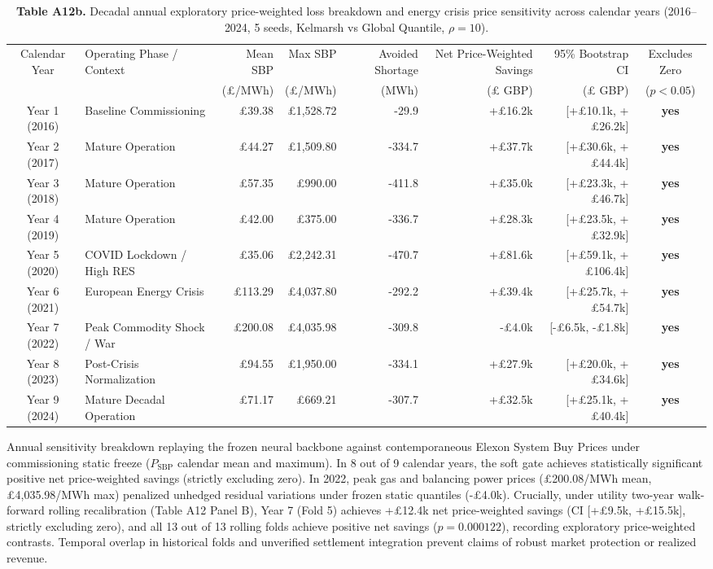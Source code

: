 \documentclass[
  journal]{IEEEtran}
\begin{document}
\begin{table}[!t]
\centering
\fontsize{8.0pt}{9.6pt}\selectfont
\setlength{\tabcolsep}{2.2pt}
\renewcommand{\arraystretch}{1.06}
\caption*{\textbf{Table A12b.} Decadal annual exploratory price-weighted loss breakdown and energy crisis price sensitivity across calendar years (2016--2024, 5 seeds, Kelmarsh vs Global Quantile, $\rho=10$).}
%
\setlength{\tabcolsep}{3pt}
\begin{tabularx}{\linewidth}{c >{\raggedright\arraybackslash}X r r r r r c}
\toprule
Calendar Year & Operating Phase / Context & Mean SBP & Max SBP & Avoided Shortage & Net Price-Weighted Savings & 95\% Bootstrap CI & Excludes Zero \\
 & & (£/MWh) & (£/MWh) & (MWh) & (£ GBP) & (£ GBP) & ($p < 0.05$) \\
\midrule
Year 1 (2016) & Baseline Commissioning & £39.38 & £1,528.72 & -29.9 & +£16.2k & [+£10.1k, +£26.2k] & \textbf{yes} \\
Year 2 (2017) & Mature Operation & £44.27 & £1,509.80 & -334.7 & +£37.7k & [+£30.6k, +£44.4k] & \textbf{yes} \\
Year 3 (2018) & Mature Operation & £57.35 & £990.00 & -411.8 & +£35.0k & [+£23.3k, +£46.7k] & \textbf{yes} \\
Year 4 (2019) & Mature Operation & £42.00 & £375.00 & -336.7 & +£28.3k & [+£23.5k, +£32.9k] & \textbf{yes} \\
Year 5 (2020) & COVID Lockdown / High RES & £35.06 & £2,242.31 & -470.7 & +£81.6k & [+£59.1k, +£106.4k] & \textbf{yes} \\
Year 6 (2021) & European Energy Crisis & £113.29 & £4,037.80 & -292.2 & +£39.4k & [+£25.7k, +£54.7k] & \textbf{yes} \\
Year 7 (2022) & Peak Commodity Shock / War & £200.08 & £4,035.98 & -309.8 & -£4.0k & [-£6.5k, -£1.8k] & \textbf{yes} \\
Year 8 (2023) & Post-Crisis Normalization & £94.55 & £1,950.00 & -334.1 & +£27.9k & [+£20.0k, +£34.6k] & \textbf{yes} \\
Year 9 (2024) & Mature Decadal Operation & £71.17 & £669.21 & -307.7 & +£32.5k & [+£25.1k, +£40.4k] & \textbf{yes} \\
\bottomrule
\end{tabularx}\vspace{1mm}
\fontsize{8.0pt}{9.6pt}\selectfont Annual sensitivity breakdown replaying the frozen neural backbone against contemporaneous Elexon System Buy Prices under commissioning static freeze ($P_{\mathrm{SBP}}$ calendar mean and maximum). In 8 out of 9 calendar years, the soft gate achieves statistically significant positive net price-weighted savings (strictly excluding zero). In 2022, peak gas and balancing power prices (£200.08/MWh mean, £4,035.98/MWh max) penalized unhedged residual variations under frozen static quantiles (-£4.0k). Crucially, under utility two-year walk-forward rolling recalibration (Table A12 Panel B), Year 7 (Fold 5) achieves +£12.4k net price-weighted savings (CI [+£9.5k, +£15.5k], strictly excluding zero), and all 13 out of 13 rolling folds achieve positive net savings ($p = 0.000122$), recording exploratory price-weighted contrasts. Temporal overlap in historical folds and unverified settlement integration prevent claims of robust market protection or realized revenue.

\end{table}
\end{document}

